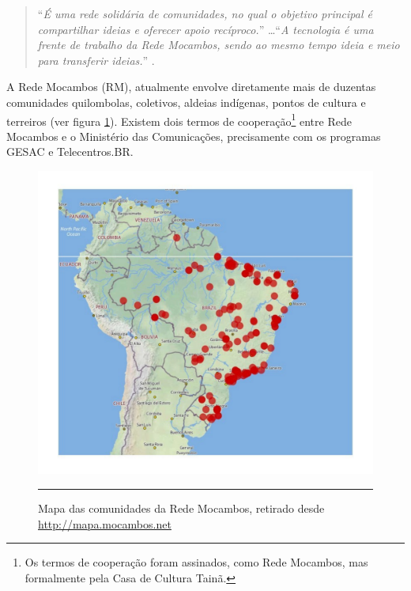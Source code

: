 \begin{quote}
  ``\emph{É uma rede solidária de comunidades, no qual o objetivo
    principal é compartilhar ideias e oferecer apoio recíproco.}''
  \ldots ``\emph{A tecnologia é uma frente de trabalho da Rede
    Mocambos, sendo ao mesmo tempo ideia e meio para transferir
    ideias.}'' \citep{RMSobre}.
\end{quote}

A Rede Mocambos (RM), atualmente envolve diretamente mais de duzentas
comunidades quilombolas, coletivos, aldeias indígenas, pontos de
cultura e terreiros (ver figura \ref{fig:MappaRedeMocambos}). Existem
dois termos de cooperação\footnote{Os termos de cooperação foram
  assinados, como Rede Mocambos, mas formalmente pela Casa de Cultura
  Tainã.} entre Rede Mocambos e o Ministério das Comunicações,
precisamente com os programas GESAC e Telecentros.BR.

\begin{figure}[htbp]
  \centering
  \includegraphics[width=\textwidth]{./Figure/MappaRedeMocambos.pdf}
  \rule{35em}{0.5pt}
  \caption[Mapa das comunidades da Rede Mocambos, retirado deste
  \url{http://mapa.mocambos.net}]{Mapa das comunidades da Rede Mocambos, retirado desde
  \url{http://mapa.mocambos.net}}
  \label{fig:MappaRedeMocambos}
\end{figure}

